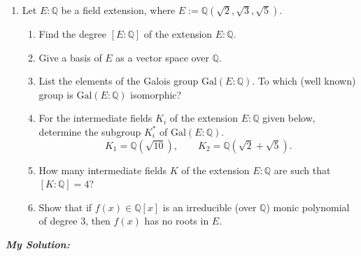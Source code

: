 \documentclass[11pt]{article}
\begin{document}
\large
\begin{enumerate}[resume, label={3.}, left=0pt]
  \item Let $E:\mathbb{Q}$ be a field extension, where $E:=\mathbb{Q}(\sqrt{2},\sqrt{3},\sqrt{5})$.
  \begin{enumerate}[label={(\alph*)}, left=0pt]
    \item {} Find the degree $[E:\mathbb{Q}]$ of the extension $E:\mathbb{Q}$.
    \item {} Give a basis of $E$ as a vector space over $\mathbb{Q}$.
    \item {} List the elements of the Galois group $\mathrm{Gal}(E:\mathbb{Q})$. To which (well known) group is $\mathrm{Gal}(E:\mathbb{Q})$ isomorphic?
    \item {} For the intermediate fields $K_{i}$ of the extension $E:\mathbb{Q}$ given below, determine the subgroup $K_{i}^{*}$ of $\mathrm{Gal}(E:\mathbb{Q})$.
    \[
      K_{1} = \mathbb{Q}(\sqrt{10}),\quad \quad K_{2} = \mathbb{Q}(\sqrt{2}+\sqrt{5}).
    \]
    \item {} How many intermediate fields $K$ of the extension $E:\mathbb{Q}$ are such that $[K:\mathbb{Q}]=4$?
    \item {} Show that if $f(x)\in\mathbb{Q}[x]$ is an irreducible (over $\mathbb{Q}$) monic polynomial of degree $3$, then $f(x)$ has no roots in $E$.
  \end{enumerate}
\end{enumerate}
\normalsize
\textit{\textbf{My Solution:}}
\end{document}
